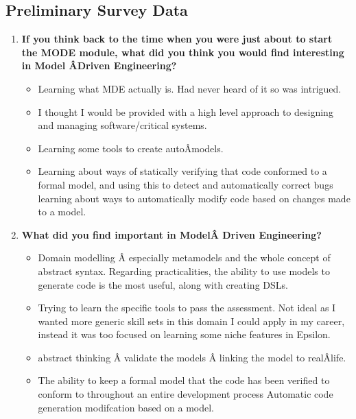 \documentclass[12pt, a4paper]{report}
\begin{document}
\begin{appendices}
\chapter{Preliminary Survey Data}
\label{chap:Preliminary Survey Data}

\begin{enumerate}
\item \textbf{If you think back to the time when you were just about to start the MODE module, what did you think you would find interesting in Model Â­Driven Engineering?}
\begin{itemize}
\item Learning what MDE actually is. Had never heard of it so was intrigued.
\item I thought I would be provided with a high level approach to designing and managing software/critical systems.
\item Learning some tools to create autoÂ­models.
\item Learning about ways of statically verifying that code conformed to a formal model, and using this to detect and automatically correct bugs learning about ways to automatically modify code based on changes made to a model.
\end{itemize}

\item \textbf{What did you find important in ModelÂ­ Driven Engineering?}
\begin{itemize}
\item Domain modelling Â­ especially metamodels and the whole concept of abstract syntax. Regarding practicalities, the ability to use models to generate code is the most useful, along with creating DSLs.
\item Trying to learn the specific tools to pass the assessment. Not ideal as I wanted more generic
skill sets in this domain I could apply in my career, instead it was too focused on learning some niche features in Epsilon.
\item abstract thinking Â­ validate the models Â­ linking the model to realÂ­life.
\item The ability to keep a formal model that the code has been verified to conform to throughout
an entire development process Automatic code generation modifcation based on a model.
\end{itemize}


\end{enumerate}
\end{appendices}
\end{document}
